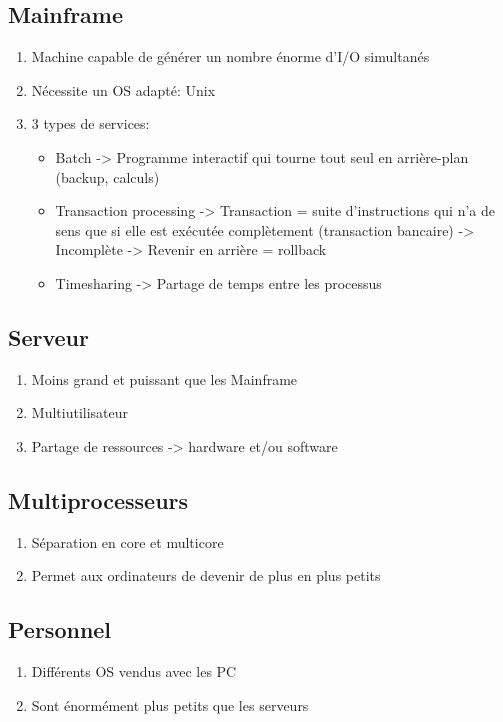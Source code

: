 \subsection{Mainframe}
\begin{enumerate}
\item Machine capable de générer un nombre énorme d'I/O simultanés
\item Nécessite un OS adapté: Unix
\item 3 types de services:
\begin{itemize}
  \item Batch -> Programme interactif qui tourne tout seul en arrière-plan (backup, calculs)
  \item Transaction processing -> Transaction = suite d'instructions qui n'a de sens que si elle est exécutée complètement (transaction bancaire) -> Incomplète -> Revenir en arrière = rollback
  \item Timesharing -> Partage de temps entre les processus
\end{itemize}
\end{enumerate}

\subsection{Serveur}
\begin{enumerate}
  \item Moins grand et puissant que les Mainframe
  \item Multiutilisateur
  \item Partage de ressources -> hardware et/ou software
\end{enumerate}

\subsection{Multiprocesseurs}
\begin{enumerate}
  \item Séparation en core et multicore
  \item Permet aux ordinateurs de devenir de plus en plus petits
\end{enumerate}

\subsection{Personnel}
\begin{enumerate}
  \item Différents OS vendus avec les PC
  \item Sont énormément plus petits que les serveurs
\end{enumerate}

